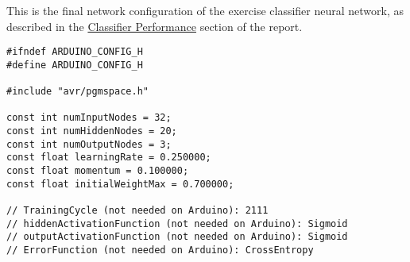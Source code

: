 \documentclass[a4paper]{article}
\begin{document}
This is the final network configuration of the exercise classifier neural network, as described in the \hyperref[subsec:ev_cp]{Classifier Performance} section of the report.

\begin{lstlisting}
#ifndef ARDUINO_CONFIG_H
#define ARDUINO_CONFIG_H

#include "avr/pgmspace.h"

const int numInputNodes = 32;
const int numHiddenNodes = 20;
const int numOutputNodes = 3;
const float learningRate = 0.250000;
const float momentum = 0.100000;
const float initialWeightMax = 0.700000;

// TrainingCycle (not needed on Arduino): 2111
// hiddenActivationFunction (not needed on Arduino): Sigmoid
// outputActivationFunction (not needed on Arduino): Sigmoid
// ErrorFunction (not needed on Arduino): CrossEntropy


\end{lstlisting}
\end{document}
